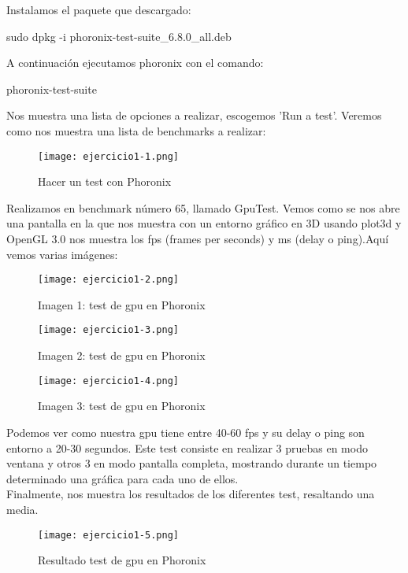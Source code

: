 	Instalamos el paquete que descargado:\\
	\begin{center}
		sudo dpkg -i phoronix-test-suite\_6.8.0\_all.deb
	\end{center}
	A continuación ejecutamos phoronix con el comando:
	\begin{center}
		phoronix-test-suite
	\end{center}
	
	Nos muestra una lista de opciones a realizar, escogemos 'Run a test'. Veremos como nos muestra una lista de benchmarks a realizar:
	\begin{figure}[H] 
		\centering
		\texttt{[image: ejercicio1-1.png]} 
		\label{figura1} 
		\caption{Hacer un test con Phoronix}
	\end{figure} 
	
	Realizamos en benchmark número 65, llamado GpuTest. Vemos como se nos abre una pantalla en la que nos muestra con un entorno gráfico en 3D usando plot3d y OpenGL 3.0 nos muestra los fps (frames per seconds) y ms (delay o ping).Aquí vemos varias imágenes:
	
	\begin{figure}[H] 
		\centering
		\texttt{[image: ejercicio1-2.png]} 
		\label{figura2} 
		\caption{Imagen 1: test de gpu en Phoronix}
	\end{figure}
	
	\begin{figure}[H] 
		\centering
		\texttt{[image: ejercicio1-3.png]} 
		\label{figura3} 
		\caption{Imagen 2: test de gpu en Phoronix}
	\end{figure}
	
	\begin{figure}[H] 
		\centering
		\texttt{[image: ejercicio1-4.png]} 
		\label{figura4} 
		\caption{Imagen 3: test de gpu en Phoronix}
	\end{figure}
	
    Podemos ver como nuestra gpu tiene entre 40-60 fps y su delay o ping son entorno a 20-30 segundos. Este test consiste en realizar 3 pruebas en modo ventana y otros 3 en modo pantalla completa, mostrando durante un tiempo determinado una gráfica para cada uno de ellos.\\
    Finalmente, nos muestra los resultados de los diferentes test, resaltando una media.
    
    \begin{figure}[H] 
    	\centering
    	\texttt{[image: ejercicio1-5.png]} 
    	\label{figura5} 
    	\caption{Resultado test de gpu en Phoronix}
    \end{figure}
    
